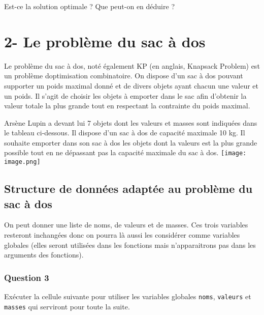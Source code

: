 \documentclass[
  paper=a4,
  ,captions=tableheading
]{scrartcl}
\begin{document}
Est-ce la solution optimale ? Que peut-on en déduire ?

\hypertarget{2--le-probluxe8me-du-sac-uxe0-dos}{%
\section{2- Le problème du sac à
dos}\label{2--le-probluxe8me-du-sac-uxe0-dos}}

Le problème du sac à dos, noté également KP (en anglais, Knapsack
Problem) est un problème d\textquotesingle optimisation combinatoire. On
dispose d'un sac à dos pouvant supporter un poids maximal donné et de
divers objets ayant chacun une valeur et un poids. Il s'agit de choisir
les objets à emporter dans le sac afin d'obtenir la valeur totale la
plus grande tout en respectant la contrainte du poids maximal.

Arsène Lupin a devant lui 7 objets dont les valeurs et masses sont
indiquées dans le tableau ci-dessous. Il dispose d'un sac à dos de
capacité maximale 10 kg. Il souhaite emporter dans son sac à dos les
objets dont la valeurs est la plus grande possible tout en ne dépassant
pas la capacité maximale du sac à dos. \texttt{[image: image.png]}

\hypertarget{structure-de-donnuxe9es-adaptuxe9e-au-probluxe8me-du-sac-uxe0-dos}{%
\subsection{Structure de données adaptée au problème du sac à
dos}\label{structure-de-donnuxe9es-adaptuxe9e-au-probluxe8me-du-sac-uxe0-dos}}

On peut donner une liste de noms, de valeurs et de masses. Ces trois
variables resteront inchangées donc on pourra là aussi les considérer
comme variables globales (elles seront utilisées dans les fonctions mais
n'apparaitrons pas dans les arguments des fonctions).

\hypertarget{question-3}{%
\subsubsection{Question 3}\label{question-3}}

Exécuter la cellule suivante pour utiliser les variables globales
\texttt{noms}, \texttt{valeurs} et \texttt{masses} qui serviront pour
toute la suite.
\end{document}
